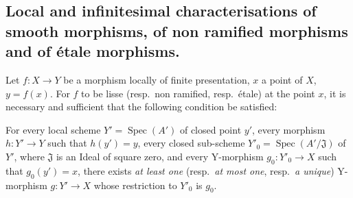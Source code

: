 \subsection{Local and infinitesimal characterisations of smooth morphisms, of non ramified morphisms and of \'etale morphisms.}
\label{subsection:IV.17.14}


\begin{proposition}[17.14.1]
\label{IV.17.14.1}
Let $f:X\to Y$ be a morphism locally of finite presentation, $x$ a point of $X$, $y=f(x)$.
For $f$ to be lisse (resp.\ non ramified, resp.\ \'etale) at the point $x$, it is necessary and sufficient that the following condition be satisfied:

For every local scheme $Y'=\operatorname{Spec}(A')$ of closed point $y'$, every morphism $h:Y'\to Y$ such that $h(y')=y$, every closed sub-scheme $Y'_0=\operatorname{Spec}(A'/\mathfrak{J})$ of $Y'$, where $\mathfrak{J}$ is an Ideal of square zero, and every Y-morphism $g_0:Y'_0\to X$ such that $g_0(y')=x$, there exists \emph{at least one} (resp.\ \emph{at most one}, resp.\ \emph{a unique}) Y-morphism $g:Y'\to X$ whose restriction to $Y'_0$ is $g_0$.
\end{proposition}

